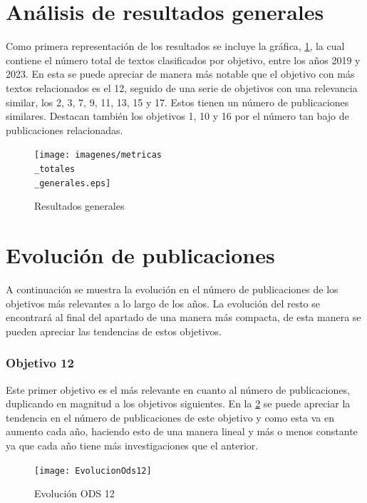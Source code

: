\section{Análisis de resultados generales}
Como primera representación de los resultados se incluye la gráfica,
\cref{fig:Resultados generales}, la cual contiene el número total de textos
clasificados por objetivo, entre los años 2019 y 2023. En esta se puede apreciar
de manera más notable que el objetivo con más textos relacionados es el 12,
seguido de una serie de objetivos con una relevancia similar, los 2, 3, 7, 9,
11, 13, 15 y 17. Estos tienen un número de publicaciones similares. Destacan
también los objetivos 1, 10 y 16 por el número tan bajo de publicaciones
relacionadas.

\begin{figure}[H]
    \centering
    \texttt{[image: imagenes/metricas\\\_totales\\\_generales.eps]}
    \captionsetup{justification=centering}
    \caption{Resultados generales}
    \label{fig:Resultados generales}
\end{figure}

\section{Evolución de publicaciones}
A continuación se muestra la evolución en el número de publicaciones de los objetivos más relevantes a lo largo de los años. La evolución del resto se encontrará al final del apartado de una manera más compacta, de esta manera se pueden apreciar las tendencias de estos objetivos. 

\subsubsection{Objetivo 12}
Este primer objetivo es el más relevante en cuanto al número de publicaciones, duplicando en magnitud a los objetivos siguientes. En la \cref{fig:Evolución ODS 12} se puede apreciar la tendencia en  el número de publicaciones de este objetivo y como  esta va en aumento cada año, haciendo esto de una manera lineal y más o menos constante ya que cada año tiene más investigaciones que el anterior. 
\begin{figure}[H]
    \centering
    \texttt{[image: EvolucionOds12]}
    \captionsetup{justification=centering}
    \caption{Evolución ODS 12}
    \label{fig:Evolución ODS 12}
\end{figure}

